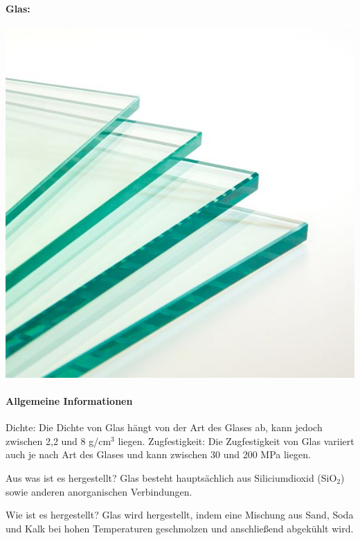 \documentclass{article}
\begin{document}
\clearpage

\newpage
\pagestyle{fancy}
\fancyhf{}

\begin{multicols}{3}

\paragraph{Glas:}
\includegraphics[width=.9\linewidth]{glas.jpg}

\paragraph{Allgemeine Informationen}
Dichte: Die Dichte von Glas hängt von der Art des Glases ab, kann jedoch
zwischen 2,2 und 8 g/cm$^3$ liegen. Zugfestigkeit: Die Zugfestigkeit von Glas
variiert auch je nach Art des Glases und kann zwischen 30 und 200 MPa liegen.

Aus was ist es hergestellt? Glas besteht hauptsächlich aus Siliciumdioxid
(SiO$_2$) sowie anderen anorganischen Verbindungen.

Wie ist es hergestellt? Glas wird hergestellt, indem eine Mischung aus Sand,
Soda und Kalk bei hohen Temperaturen geschmolzen und anschließend abgekühlt
wird.


\end{multicols}
\end{document}
